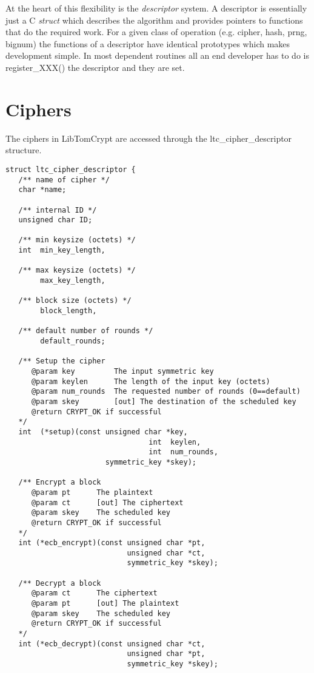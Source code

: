 \documentclass[synpaper]{book}
\newcommand{\mysection}[1]    %
	{                   %
	\section{#1}
   \markboth{\textsf{www.libtom.net}}{\thesection ~ {#1}}
	}
\begin{document}
At the heart of this flexibility is the \textit{descriptor} system.  A descriptor is essentially just a C \textit{struct} which describes the algorithm and provides pointers
to functions that do the required work.  For a given class of operation (e.g. cipher, hash, prng, bignum) the functions of a descriptor have identical prototypes which makes
development simple.  In most dependent routines all an end developer has to do is register\_XXX() the descriptor and they are set.

\mysection{Ciphers}
The ciphers in LibTomCrypt are accessed through the ltc\_cipher\_descriptor structure.

\label{sec:cipherdesc}
\begin{small}
\begin{verbatim}
struct ltc_cipher_descriptor {
   /** name of cipher */
   char *name;

   /** internal ID */
   unsigned char ID;

   /** min keysize (octets) */
   int  min_key_length,

   /** max keysize (octets) */
        max_key_length,

   /** block size (octets) */
        block_length,

   /** default number of rounds */
        default_rounds;

   /** Setup the cipher
      @param key         The input symmetric key
      @param keylen      The length of the input key (octets)
      @param num_rounds  The requested number of rounds (0==default)
      @param skey        [out] The destination of the scheduled key
      @return CRYPT_OK if successful
   */
   int  (*setup)(const unsigned char *key,
                                 int  keylen,
                                 int  num_rounds,
                       symmetric_key *skey);

   /** Encrypt a block
      @param pt      The plaintext
      @param ct      [out] The ciphertext
      @param skey    The scheduled key
      @return CRYPT_OK if successful
   */
   int (*ecb_encrypt)(const unsigned char *pt,
                            unsigned char *ct,
                            symmetric_key *skey);

   /** Decrypt a block
      @param ct      The ciphertext
      @param pt      [out] The plaintext
      @param skey    The scheduled key
      @return CRYPT_OK if successful
   */
   int (*ecb_decrypt)(const unsigned char *ct,
                            unsigned char *pt,
                            symmetric_key *skey);


\end{verbatim}
\end{small}
\end{document}
